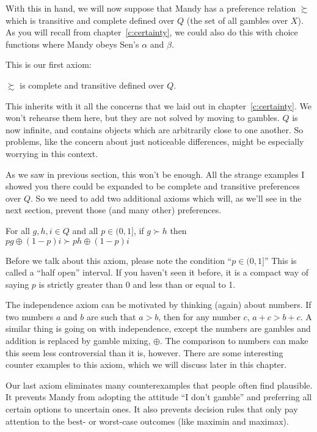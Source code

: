 With this in hand, we will now suppose that Mandy has a preference relation $\succsim$ which is transitive and complete defined over $Q$ (the set of all gambles over $X$).  As you will recall from chapter~\ref{c:certainty}, we could also do this with choice functions where Mandy obeys Sen's $\alpha$ and $\beta$. 

This is our first axiom:
\begin{definition}[Axiom 1]
$\succsim$ is complete and transitive defined over $Q$.
\end{definition}

This inherits with it all the concerns that we laid out in chapter~\ref{c:certainty}. We won't rehearse them here, but they are not solved by moving to gambles.  $Q$ is now infinite, and contains objects which are arbitrarily close to one another.  So problems, like the concern about just noticeable differences, might be especially worrying in this context.

As we saw in previous section, this won't be enough. All the strange examples I showed you there could be expanded to be complete and transitive preferences over $Q$.  So we need to add two additional axioms which will, as we'll see in the next section, prevent those (and many other) preferences.

\begin{definition}
For all $g, h, i \in Q$ and all $p \in (0,1]$, if $g \succ h$ then $p g \oplus (1-p) i \succ p h \oplus (1-p) i$
\end{definition}
\nomenclature{$(], [)$}{Used to denote the half-open interval of numbers. For example (0,1] denotes the set of real numbers that are strictly greater than 0 and less than or equal to 1.} Before we talk about this axiom, please note the condition ``$p \in (0,1]$''  This is called a ``half open'' interval.  If you haven't seen it before, it is a compact way of saying $p$ is strictly greater than 0 and less than or equal to 1.

The independence axiom can be motivated by thinking (again) about numbers.  If two numbers $a$ and $b$ are such that $a > b$, then for any number $c$, $a + c > b + c$.  A similar thing is going on with independence, except the numbers are gambles and addition is replaced by gamble mixing, $\oplus$.  The comparison to numbers can make this seem less controversial than it is, however.  There are some interesting counter examples to this axiom, which we will discuss later in this chapter. 

Our last axiom eliminates many counterexamples that people often find plausible.  It prevents Mandy from adopting the attitude ``I don't gamble'' and preferring all certain options to uncertain ones.  It also prevents decision rules that only pay attention to the best- or worst-case outcomes (like maximin and maximax).  

